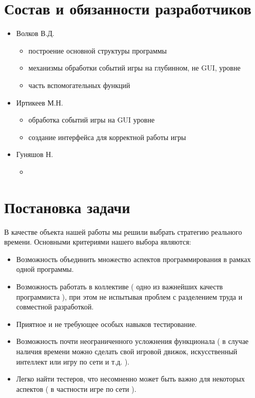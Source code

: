 \documentclass[a4paper,12pt,fleqn]{article} %
\begin{document}
\section{Состав и обязанности разработчиков}
\begin{itemize}
    \item Волков В.Д.
        \begin{itemize}
            \item построение основной структуры программы
            \item механизмы обработки событий игры на глубинном, не GUI, уровне
            \item часть вспомогательных функций
        \end{itemize}
    \item Иртикеев М.Н.
        \begin{itemize}
            \item обработка событий игры на GUI уровне
            \item создание интерфейса для корректной работы игры
        \end{itemize}
    \item Гуняшов Н.
        \begin{itemize}
            \item
        \end{itemize}
\end{itemize}

\newpage
\section{Постановка задачи}
В качестве объекта нашей работы мы решили выбрать стратегию реального времени.
Основными критериями нашего выбора являются:
\begin{itemize}
    \item Возможность объединить множество аспектов программирования в рамках одной программы.
    \item Возможность работать в коллективе ( одно из важнейших качеств программиста ), при этом не испытывая проблем с разделением труда и совместной разработкой.
    \item Приятное и не требующее особых навыков тестирование.
    \item Возможность почти неограниченного усложнения функционала ( в случае наличия времени можно сделать свой игровой движок, искусственный интеллект или игру по сети и т.д. ). 
    \item Легко найти тестеров, что несомненно может быть важно для некоторых аспектов ( в частности игре по сети ).
\end{itemize}
\newpage
\end{document}

